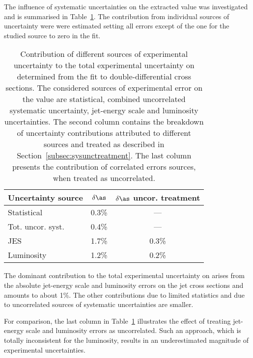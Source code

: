 The influence of systematic uncertainties on the extracted \asz value was investigated and is summarised in Table~\ref{tab:asuncbreakdown}. The contribution from individual sources of uncertainty were were estimated setting all errors except of the one for the studied source to zero in the \as fit.
\begin{table}
\centering
\begin{tabular}{|l|c|c|}
 \hline
 Uncertainty source & $\delta\as$ & $\delta\as$ uncor. treatment\\
 \hline\hline
 Statistical       & 0.3\% & ---     \\
 Tot. uncor. syst. & 0.4\% & ---     \\
 JES               & 1.7\% & 0.3\%   \\
 Luminosity        & 1.2\% & 0.2\%   \\
 \hline
\end{tabular}
\caption{Contribution of different sources of experimental uncertainty to the total experimental uncertainty on \asz determined from the fit to double-differential cross sections. The considered sources of experimental error on the \asz value are statistical, combined uncorrelated systematic uncertainty, jet-energy scale and luminosity uncertainties. The second column contains the breakdown of uncertainty contributions attributed to different sources and treated as described in Section~\ref{subsec:sysunctreatment}. The last column presents the contribution of correlated errors sources, when treated as uncorrelated.}
\label{tab:asuncbreakdown}
\end{table}

The dominant contribution to the total experimental uncertainty on \as arises from the absolute jet-energy scale and luminosity errors on the jet cross sections and amounts to about 1\%. The other contributions due to limited statistics and due to uncorrelated sources of systematic uncertainties are smaller. 

For comparison, the last column in Table~\ref{tab:asuncbreakdown} illustrates the effect of treating jet-energy scale and luminosity errors as uncorrelated. Such an approach, which is totally inconsistent for the luminosity, results in an underestimated magnitude of experimental uncertainties.